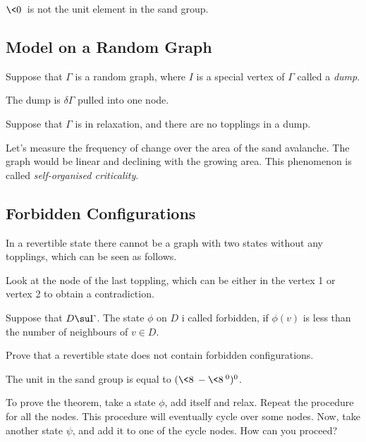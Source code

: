 \documentclass[11pt]{scrartcl}
\begin{document}
  \begin{note*}
    $\<0\>$ is not the unit element in the sand group.
  \end{note*}

  \subsection{Model on a Random Graph}

  Suppose that $\Gamma$ is a random graph, where $I$ is a special vertex of $\Gamma$ called a \textit{dump}.

  The dump is $\delta \Gamma$ pulled into one node.

  Suppose that $\Gamma$ is in relaxation, and there are no topplings in a dump.

  Let's measure the frequency of change over the area of the sand
  avalanche. The graph would be linear and declining with the growing
  area. This phenomenon is called \textit{self-organised criticality}.

  \subsection{Forbidden Configurations}

  \begin{example}

    In a revertible state there cannot be a graph with two states
    without any topplings, which can be seen as follows.

    Look at the node of the last toppling, which can be either in the
    vertex 1 or vertex 2 to obtain a contradiction.

  \end{example}

  \begin{definition}
    Suppose that $D \su \Gamma$. The state $\phi$ on $D$ i called
    forbidden, if $\phi(v)$ is less than the number of neighbours of $v \in D$.
  \end{definition}

  \begin{exercise}

    Prove that a revertible state does not contain forbidden
    configurations.

  \end{exercise}

  \begin{exercise}

    The unit in the sand group is equal to
    $(\< 8 \> - \<8\>^{0})^{0}$. 

  \end{exercise}

  To prove the theorem, take a state $\phi$, add itself and relax.
  Repeat the procedure for all the nodes. This procedure will
  eventually cycle over some nodes. Now, take another state $\psi$,
  and add it to one of the cycle nodes. How can you proceed?
\end{document}
